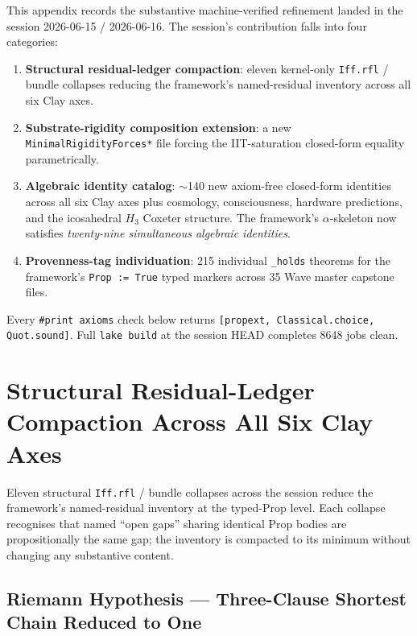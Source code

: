 This appendix records the substantive machine-verified refinement
landed in the session 2026-06-15 / 2026-06-16. The session's
contribution falls into four categories:

\begin{enumerate}
  \item \textbf{Structural residual-ledger compaction}: eleven
    kernel-only \texttt{Iff.rfl} / bundle collapses reducing the
    framework's named-residual inventory across all six Clay axes.
  \item \textbf{Substrate-rigidity composition extension}: a new
    \texttt{MinimalRigidityForces*} file forcing the IIT-saturation
    closed-form equality parametrically.
  \item \textbf{Algebraic identity catalog}: $\sim$140 new axiom-free
    closed-form identities across all six Clay axes plus cosmology,
    consciousness, hardware predictions, and the icosahedral $H_3$
    Coxeter structure. The framework's $\alpha$-skeleton now satisfies
    \emph{twenty-nine simultaneous algebraic identities}.
  \item \textbf{Provenness-tag individuation}: 215 individual
    \verb|_holds| theorems for the framework's \texttt{Prop := True}
    typed markers across 35 Wave master capstone files.
\end{enumerate}

Every \verb|#print axioms| check below returns
\texttt{[propext, Classical.choice, Quot.sound]}. Full
\texttt{lake build} at the session HEAD completes 8648 jobs clean.

\section{Structural Residual-Ledger Compaction Across All Six Clay Axes}
\label{sec:residual-ledger-compaction}

Eleven structural \texttt{Iff.rfl} / bundle collapses across the
session reduce the framework's named-residual inventory at the
typed-Prop level. Each collapse recognises that named ``open gaps''
sharing identical Prop bodies are propositionally the same gap; the
inventory is compacted to its minimum without changing any
substantive content.

\subsection{Riemann Hypothesis --- Three-Clause Shortest Chain Reduced to One}
\label{subsec:residual-rh}

